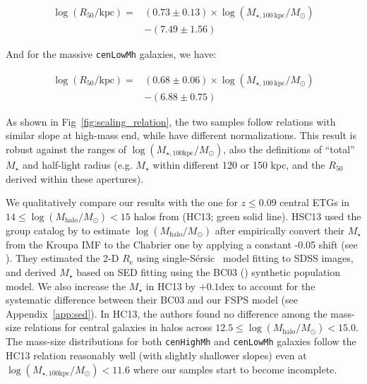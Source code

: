 \documentclass[a4paper,fleqn,usenatbib]{mnras}
\def\ser{{S\'{e}rsic\ }}
\def\rbcg{\texttt{cenHighMh}}
\def\nbcg{\texttt{cenLowMh}}
\def\mstar{{$M_{\star}$}}
\def\logmh{{$\log (M_{\mathrm{halo}}/M_{\odot})$}}
\def\logmtot{{$\log (M_{\star,100\mathrm{kpc}}/M_{\odot})$}}
\begin{document}
    \begin{equation}
        \begin{aligned}
        \log (R_{\mathrm{50}}/\mathrm{kpc}) = & (0.73\pm0.13) \times \log (M_{\star, 100\ \mathrm{kpc}}/M_{\odot}) \\ & -(7.49\pm1.56)
        \end{aligned}
    \end{equation}

    \noindent And for the massive \nbcg{} galaxies, we have:
    
    \begin{equation}
        \begin{aligned}
        \log (R_{\mathrm{50}}/\mathrm{kpc}) = & (0.68\pm0.06) \times \log (M_{\star, 100\ \mathrm{kpc}}/M_{\odot}) \\ & -(6.88\pm0.75)
        \end{aligned}
    \end{equation}
    
    \noindent As shown in Fig~\ref{fig:scaling_relation}, the two samples follow 
    relations with similar slope at high-mass end, while have different normalizations.
    This result is robust against the ranges of \logmtot{}, also the definitions of 
    ``total'' \mstar{} and  half-light radius (e.g. \mstar{} within different 120 or 150 
    kpc, and the $R_{\mathrm{50}}$ derived within these apertures).
    
    We qualitatively compare our results with the one for $z\leq 0.09$ central ETGs in  
    $14\le$\logmh{}$<15$ halos from \citealt{HCompany13} (HC13; green solid line).
    HSC13 used the group catalog by \citet{Yang2007} to estimate \logmh{} after
    empirically convert their \mstar{} from the Kroupa IMF to the Chabrier one 
    by applying a constant -0.05 shift (see \citealt{Bernardi2016}).
    They estimated the 2-D $R_{\mathrm{e}}$ using single-\ser{} model fitting to SDSS 
    images, and derived \mstar{} based on SED fitting using the BC03 (\citealt{BC03}) 
    synthetic population model.
    We also increase the \mstar{} in HC13 by $+0.1$dex to account for the systematic 
    difference between their BC03 and our FSPS model (see Appendix~\ref{app:sed}). 
    In HC13, the authors found no difference among the mass-size relations for 
    central galaxies in halos across $12.5\le$\logmh{}$<15.0$. 
    The mass-size distributions for both \rbcg{} and \nbcg{} galaxies follow the 
    HC13 relation reasonably well (with slightly shallower slopes) even at 
    \logmtot{}$< 11.6$ where our samples start to become incomplete. 
    
\end{document}
